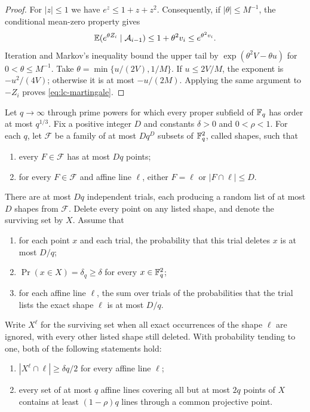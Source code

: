 \begin{proof}
For $|z|\leq1$ we have $e^z\leq1+z+z^2$. Consequently, if
$|\theta|\leq M^{-1}$, the conditional mean-zero property gives
\[
 \mathbb E(e^{\theta Z_i}\mid\mathcal A_{i-1})
 \leq 1+\theta^2v_i\leq e^{\theta^2v_i}.
\]
Iteration and Markov's inequality bound the upper tail by
$\exp(\theta^2V-\theta u)$ for $0<\theta\leq M^{-1}$.
Take $\theta=\min\{u/(2V),1/M\}$. If $u\leq2V/M$, the exponent is
$-u^2/(4V)$; otherwise it is at most $-u/(2M)$.
Applying the same argument to $-Z_i$ proves
\eqref{eq:lc-martingale}.

\end{proof}

\begin{lemma}\label{lem:linecover}
Let $q\to\infty$ through prime powers for which every proper subfield
of $\mathbb F_q$ has order at most $q^{1/3}$. Fix a positive integer $D$ and
constants $\delta>0$ and $0<\rho<1$. For each $q$, let $\mathcal F$ be a
family of at most $Dq^D$ subsets of $\mathbb F_q^2$, called shapes, such that
\begin{enumerate}
 \item every $F\in\mathcal F$ has at most $Dq$ points;
 \item for every $F\in\mathcal F$ and affine line $\ell$, either
       $F=\ell$ or $|F\cap\ell|\leq D$.
\end{enumerate}
There are at most $Dq$ independent trials, each producing a random list
of at most $D$ shapes from $\mathcal F$. Delete every point on any listed
shape, and denote the surviving set by $X$. Assume that
\begin{enumerate}
 \item for each point $x$ and each trial, the probability that this
       trial deletes $x$ is at most $D/q$;
 \item $\Pr(x\in X)=\delta_q\geq\delta$ for every $x\in\mathbb F_q^2$;
 \item for each affine line $\ell$, the sum over trials of the
       probabilities that the trial lists the exact shape $\ell$ is
       at most $D/q$.
\end{enumerate}
Write $X^\ell$ for the surviving set when all exact occurrences of the
shape $\ell$ are ignored, with every other listed shape still deleted.
With probability tending to one, both of the following statements
hold:
\begin{enumerate}
 \item $|X^\ell\cap\ell|\geq\delta q/2$ for every affine line $\ell$;
 \item every set of at most $q$ affine lines covering all but at most
       $2q$ points of $X$ contains at least $(1-\rho)q$ lines through a
       common projective point.
\end{enumerate}
\end{lemma}

